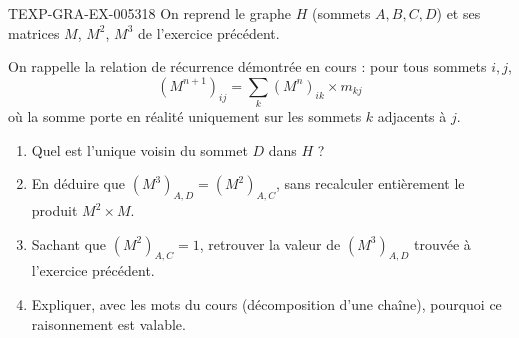 \begin{exercice}{TEXP-GRA-EX-005}{3}{18}
On reprend le graphe $H$ (sommets $A,B,C,D$) et ses matrices $M$, $M^2$, $M^3$ de l'exercice précédent.

On rappelle la relation de récurrence démontrée en cours : pour tous sommets $i,j$,
$$(M^{n+1})_{ij}=\sum_{k}(M^n)_{ik}\times m_{kj}$$
où la somme porte en réalité uniquement sur les sommets $k$ adjacents à $j$.
\begin{enumerate}
  \item Quel est l'unique voisin du sommet $D$ dans $H$ ?
  \item En déduire que $(M^3)_{A,D}=(M^2)_{A,C}$, sans recalculer entièrement le produit $M^2\times M$.
  \item Sachant que $(M^2)_{A,C}=1$, retrouver la valeur de $(M^3)_{A,D}$ trouvée à l'exercice précédent.
  \item Expliquer, avec les mots du cours (décomposition d'une chaîne), pourquoi ce raisonnement est valable.
\end{enumerate}
\end{exercice}
